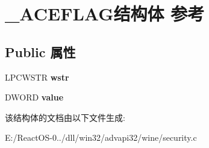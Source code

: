 \hypertarget{struct___a_c_e_f_l_a_g}{}\section{\+\_\+\+A\+C\+E\+F\+L\+A\+G结构体 参考}
\label{struct___a_c_e_f_l_a_g}
\subsection*{Public 属性}
\begin{DoxyCompactItemize}
\item 
\mbox{\label{struct___a_c_e_f_l_a_g_aadb405605216eaf88a1f02dad2d5f3a2}} 
L\+P\+C\+W\+S\+TR {\bfseries wstr}
\item 
\mbox{\label{struct___a_c_e_f_l_a_g_a68fd6619dd8e046ae851f9017355778b}} 
D\+W\+O\+RD {\bfseries value}
\end{DoxyCompactItemize}


该结构体的文档由以下文件生成\+:\begin{DoxyCompactItemize}
\item 
E\+:/\+React\+O\+S-\/0../dll/win32/advapi32/wine/security.\+c\end{DoxyCompactItemize}

